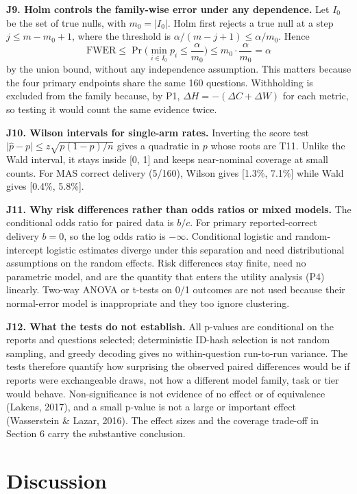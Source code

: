 \documentclass[letterpaper]{article}
\begin{document}
\textbf{J9. Holm controls the family-wise error under any dependence.} Let \(I_0\) be the set of true nulls, with \(m_0=\lvert I_0\rvert\). Holm first rejects a true null at a step \(j\le m-m_0+1\), where the threshold is \(\alpha/(m-j+1)\le\alpha/m_0\). Hence \[\mathrm{FWER}\le\Pr\Big(\min_{i\in I_0}p_i\le\frac{\alpha}{m_0}\Big)\le m_0\cdot\frac{\alpha}{m_0}=\alpha\] by the union bound, without any independence assumption. This matters because the four primary endpoints share the same 160 questions. Withholding is excluded from the family because, by P1, \(\Delta H=-(\Delta C+\Delta W)\) for each metric, so testing it would count the same evidence twice.

\textbf{J10. Wilson intervals for single-arm rates.} Inverting the score test \(\lvert\hat p-p\rvert\le z\sqrt{p(1-p)/n}\) gives a quadratic in \(p\) whose roots are T11. Unlike the Wald interval, it stays inside {[}0, 1{]} and keeps near-nominal coverage at small counts. For MAS correct delivery (5/160), Wilson gives {[}1.3\%, 7.1\%{]} while Wald gives {[}0.4\%, 5.8\%{]}.

\textbf{J11. Why risk differences rather than odds ratios or mixed models.} The conditional odds ratio for paired data is \(b/c\). For primary reported-correct delivery \(b=0\), so the log odds ratio is \(-\infty\). Conditional logistic and random-intercept logistic estimates diverge under this separation and need distributional assumptions on the random effects. Risk differences stay finite, need no parametric model, and are the quantity that enters the utility analysis (P4) linearly. Two-way ANOVA or t-tests on 0/1 outcomes are not used because their normal-error model is inappropriate and they too ignore clustering.

\textbf{J12. What the tests do not establish.} All p-values are conditional on the reports and questions selected; deterministic ID-hash selection is not random sampling, and greedy decoding gives no within-question run-to-run variance. The tests therefore quantify how surprising the observed paired differences would be if reports were exchangeable draws, not how a different model family, task or tier would behave. Non-significance is not evidence of no effect or of equivalence (Lakens, 2017), and a small p-value is not a large or important effect (Wasserstein \& Lazar, 2016). The effect sizes and the coverage trade-off in Section 6 carry the substantive conclusion.

\section{Discussion}\label{discussion}
\end{document}
